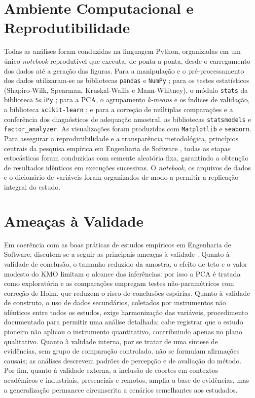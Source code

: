\section{Ambiente Computacional e Reprodutibilidade}
\label{sec:ambiente}

Todas as análises foram conduzidas na linguagem Python, organizadas em um único \textit{notebook} reprodutível que executa, de ponta a ponta, desde o carregamento dos dados até a geração das figuras. Para a manipulação e o pré-processamento dos dados utilizaram-se as bibliotecas \texttt{pandas} \cite{mckinney2010} e \texttt{NumPy} \cite{harris2020}; para os testes estatísticos (Shapiro-Wilk, Spearman, Kruskal-Wallis e Mann-Whitney), o módulo \texttt{stats} da biblioteca \texttt{SciPy} \cite{virtanen2020}; para a PCA, o agrupamento \textit{k-means} e os índices de validação, a biblioteca \texttt{scikit-learn} \cite{pedregosa2011}; e para a correção de múltiplas comparações e a conferência dos diagnósticos de adequação amostral, as bibliotecas \texttt{statsmodels} e \texttt{factor\_analyzer}. As visualizações foram produzidas com \texttt{Matplotlib} \cite{hunter2007} e \texttt{seaborn}. Para assegurar a reprodutibilidade e a transparência metodológica, princípios centrais da pesquisa empírica em Engenharia de Software \cite{kitchenham2009}, todas as etapas estocásticas foram conduzidas com semente aleatória fixa, garantindo a obtenção de resultados idênticos em execuções sucessivas. O \textit{notebook}, os arquivos de dados e o dicionário de variáveis foram organizados de modo a permitir a replicação integral do estudo.

\section{Ameaças à Validade}
\label{sec:validade}

Em coerência com as boas práticas de estudos empíricos em Engenharia de Software, discutem-se a seguir as principais ameaças à validade \cite{wohlin2012,runeson2012}. Quanto à validade de conclusão, o tamanho reduzido da amostra, o efeito de teto e o valor modesto do KMO limitam o alcance das inferências; por isso a PCA é tratada como exploratória e as comparações empregam testes não-paramétricos com correção de Holm, que reduzem o risco de conclusões espúrias. Quanto à validade de construto, o uso de dados secundários, coletados por instrumentos não idênticos entre todos os estudos, exige harmonização das variáveis, procedimento documentado para permitir uma análise detalhada; cabe registrar que o estudo pioneiro não aplicou o instrumento quantitativo, contribuindo apenas no plano qualitativo. Quanto à validade interna, por se tratar de uma síntese de evidências, sem grupo de comparação controlado, não se formulam afirmações causais; as análises descrevem padrões de percepção e de avaliação do método. Por fim, quanto à validade externa, a inclusão de coortes em contextos acadêmicos e industriais, presenciais e remotos, amplia a base de evidências, mas a generalização permanece circunscrita a cenários semelhantes aos estudados.